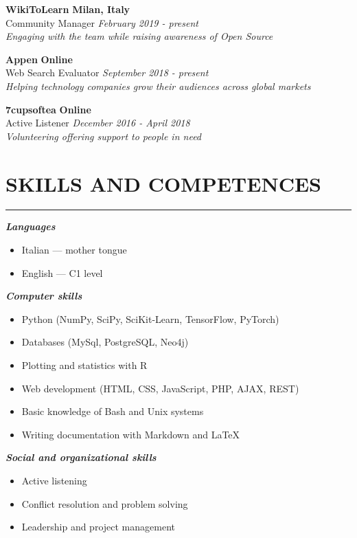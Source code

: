 \documentclass[10pt]{article}
\begin{document}
	\textbf{WikiToLearn}
	\hfill
	\textbf{Milan, Italy} \\
	Community Manager
	\hfill
	\textit{February 2019 - present} \\
	\textit{Engaging with the team while raising awareness of Open Source}
	
	\textbf{Appen}
	\hfill
	\textbf{Online} \\
	Web Search Evaluator
	\hfill
	\textit{September 2018 - present} \\
	\textit{Helping technology companies grow their audiences across global markets}
	
	\textbf{7cupsoftea}
	\hfill
	\textbf{Online} \\
	Active Listener
	\hfill
	\textit{December 2016 - April 2018} \\
	\textit{Volunteering offering support to people in need}
	
	\section*{SKILLS AND COMPETENCES}
	{\color{darkRed}\rule{\linewidth}{0.5pt}}
	
	\textbf{\textit{Languages}}
	\vspace{-1mm}
	\begin{itemize}
		\item Italian --- mother tongue
		\item English --- C1 level
	\end{itemize}
	\medskip
	\textbf{\textit{Computer skills}}
	\vspace{-1mm}
	\begin{itemize}
		\item Python (NumPy, SciPy, SciKit-Learn, TensorFlow, PyTorch)
		\item Databases (MySql, PostgreSQL, Neo4j)
		\item Plotting and statistics with R
		\item Web development (HTML, CSS, JavaScript, PHP, AJAX, REST)
		\item Basic knowledge of Bash and Unix systems
		\item Writing documentation with Markdown and LaTeX
	\end{itemize}
	\medskip
	\textbf{\textit{Social and organizational skills}}
	\vspace{-1mm}
	\begin{itemize}
		\item Active listening
		\item Conflict resolution and problem solving
		\item Leadership and project management
	\end{itemize}
	
	
\end{document}
